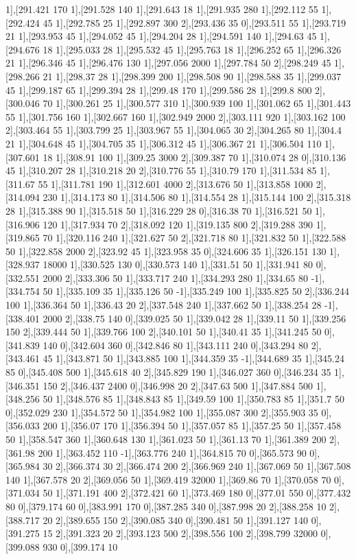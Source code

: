 {1],[291.421 170 1],[291.528 140 1],[291.643 18 1],[291.935 280 1],[292.112 55 1],[292.424 45 1],[292.785 25 1],[292.897 300 2],[293.436 35 0],[293.511 55 1],[293.719 21 1],[293.953 45 1],[294.052 45 1],[294.204 28 1],[294.591 140 1],[294.63 45 1],[294.676 18 1],[295.033 28 1],[295.532 45 1],[295.763 18 1],[296.252 65 1],[296.326 21 1],[296.346 45 1],[296.476 130 1],[297.056 2000 1],[297.784 50 2],[298.249 45 1],[298.266 21 1],[298.37 28 1],[298.399 200 1],[298.508 90 1],[298.588 35 1],[299.037 45 1],[299.187 65 1],[299.394 28 1],[299.48 170 1],[299.586 28 1],[299.8 800 2],[300.046 70 1],[300.261 25 1],[300.577 310 1],[300.939 100 1],[301.062 65 1],[301.443 55 1],[301.756 160 1],[302.667 160 1],[302.949 2000 2],[303.111 920 1],[303.162 100 2],[303.464 55 1],[303.799 25 1],[303.967 55 1],[304.065 30 2],[304.265 80 1],[304.4 21 1],[304.648 45 1],[304.705 35 1],[306.312 45 1],[306.367 21 1],[306.504 110 1],[307.601 18 1],[308.91 100 1],[309.25 3000 2],[309.387 70 1],[310.074 28 0],[310.136 45 1],[310.207 28 1],[310.218 20 2],[310.776 55 1],[310.79 170 1],[311.534 85 1],[311.67 55 1],[311.781 190 1],[312.601 4000 2],[313.676 50 1],[313.858 1000 2],[314.094 230 1],[314.173 80 1],[314.506 80 1],[314.554 28 1],[315.144 100 2],[315.318 28 1],[315.388 90 1],[315.518 50 1],[316.229 28 0],[316.38 70 1],[316.521 50 1],[316.906 120 1],[317.934 70 2],[318.092 120 1],[319.135 800 2],[319.288 390 1],[319.865 70 1],[320.116 240 1],[321.627 50 2],[321.718 80 1],[321.832 50 1],[322.588 50 1],[322.858 2000 2],[323.92 45 1],[323.958 35 0],[324.606 35 1],[326.151 130 1],[328.937 18000 1],[330.525 130 0],[330.573 140 1],[331.51 50 1],[331.941 80 0],[332.551 2000 2],[333.306 50 1],[333.717 240 1],[334.293 280 1],[334.65 80 -1],[334.754 50 1],[335.109 35 1],[335.126 50 -1],[335.249 100 1],[335.825 50 2],[336.244 100 1],[336.364 50 1],[336.43 20 2],[337.548 240 1],[337.662 50 1],[338.254 28 -1],[338.401 2000 2],[338.75 140 0],[339.025 50 1],[339.042 28 1],[339.11 50 1],[339.256 150 2],[339.444 50 1],[339.766 100 2],[340.101 50 1],[340.41 35 1],[341.245 50 0],[341.839 140 0],[342.604 360 0],[342.846 80 1],[343.111 240 0],[343.294 80 2],[343.461 45 1],[343.871 50 1],[343.885 100 1],[344.359 35 -1],[344.689 35 1],[345.24 85 0],[345.408 500 1],[345.618 40 2],[345.829 190 1],[346.027 360 0],[346.234 35 1],[346.351 150 2],[346.437 2400 0],[346.998 20 2],[347.63 500 1],[347.884 500 1],[348.256 50 1],[348.576 85 1],[348.843 85 1],[349.59 100 1],[350.783 85 1],[351.7 50 0],[352.029 230 1],[354.572 50 1],[354.982 100 1],[355.087 300 2],[355.903 35 0],[356.033 200 1],[356.07 170 1],[356.394 50 1],[357.057 85 1],[357.25 50 1],[357.458 50 1],[358.547 360 1],[360.648 130 1],[361.023 50 1],[361.13 70 1],[361.389 200 2],[361.98 200 1],[363.452 110 -1],[363.776 240 1],[364.815 70 0],[365.573 90 0],[365.984 30 2],[366.374 30 2],[366.474 200 2],[366.969 240 1],[367.069 50 1],[367.508 140 1],[367.578 20 2],[369.056 50 1],[369.419 32000 1],[369.86 70 1],[370.058 70 0],[371.034 50 1],[371.191 400 2],[372.421 60 1],[373.469 180 0],[377.01 550 0],[377.432 80 0],[379.174 60 0],[383.991 170 0],[387.285 340 0],[387.998 20 2],[388.258 10 2],[388.717 20 2],[389.655 150 2],[390.085 340 0],[390.481 50 1],[391.127 140 0],[391.275 15 2],[391.323 20 2],[393.123 500 2],[398.556 100 2],[398.799 32000 0],[399.088 930 0],[399.174 10 }
